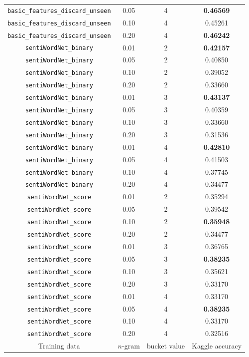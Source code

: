 \documentclass{article}
\begin{document}
{\begin{tabular}{|c|c|c|c|}
\texttt{basic\_features\_discard\_unseen} & 0.05 & 4 & \textbf{0.46569}\\
\texttt{basic\_features\_discard\_unseen} & 0.10 & 4 & 0.45261\\
\texttt{basic\_features\_discard\_unseen} & 0.20 & 4 & \textbf{0.46242}\\\hline\hline
\texttt{sentiWordNet\_binary} & 0.01 & 2 & \textbf{0.42157}\\
\texttt{sentiWordNet\_binary} & 0.05 & 2 & 0.40850\\
\texttt{sentiWordNet\_binary} & 0.10 & 2 & 0.39052\\
\texttt{sentiWordNet\_binary} & 0.20 & 2 & 0.33660\\\hline
\texttt{sentiWordNet\_binary} & 0.01 & 3 & \textbf{0.43137}\\
\texttt{sentiWordNet\_binary} & 0.05 & 3 & 0.40359\\
\texttt{sentiWordNet\_binary} & 0.10 & 3 & 0.33660\\
\texttt{sentiWordNet\_binary} & 0.20 & 3 & 0.31536\\\hline
\texttt{sentiWordNet\_binary} & 0.01 & 4 & \textbf{0.42810}\\
\texttt{sentiWordNet\_binary} & 0.05 & 4 & 0.41503\\
\texttt{sentiWordNet\_binary} & 0.10 & 4 & 0.37745\\
\texttt{sentiWordNet\_binary} & 0.20 & 4 & 0.34477\\\hline\hline
\texttt{sentiWordNet\_score} & 0.01 & 2 & 0.35294\\
\texttt{sentiWordNet\_score} & 0.05 & 2 & 0.39542\\
\texttt{sentiWordNet\_score} & 0.10 & 2 & \textbf{0.35948}\\
\texttt{sentiWordNet\_score} & 0.20 & 2 & 0.34477\\\hline
\texttt{sentiWordNet\_score} & 0.01 & 3 & 0.36765\\
\texttt{sentiWordNet\_score} & 0.05 & 3 & \textbf{0.38235}\\
\texttt{sentiWordNet\_score} & 0.10 & 3 & 0.35621\\
\texttt{sentiWordNet\_score} & 0.20 & 3 & 0.33170\\\hline
\texttt{sentiWordNet\_score} & 0.01 & 4 & 0.33170\\
\texttt{sentiWordNet\_score} & 0.05 & 4 & \textbf{0.38235}\\
\texttt{sentiWordNet\_score} & 0.10 & 4 & 0.33170\\
\texttt{sentiWordNet\_score} & 0.20 & 4 & 0.32516\\\hline
Training data & $n$-gram & bucket value & Kaggle accuracy\\\hline
\end{tabular}}\par\bigskip
\end{document}
